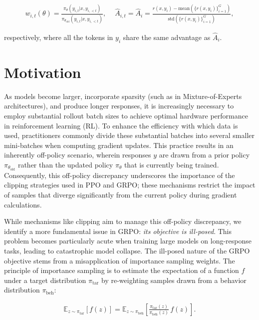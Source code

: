 \begin{align}
    w_{i,t}(\theta)=\frac{ \pi_{\theta} (y_{i,t} | x, y_{i,<t}) }{ \pi_{\theta_\text{old}} (y_{i,t} | x,y_{i,<t})},\quad\ 
    \widehat{A}_{i,t} = \widehat{A}_{i} = \frac{r(x, y_i) - \mathrm{mean} \left( \{ r(x, y_i) \}_{i=1}^G \right) }{ \mathrm{std} \left( \{ r(x, y_i) \}_{i=1}^G \right) },
\end{align}

respectively, where all the tokens in $y_i$ share the same advantage as $\widehat{A}_{i}$.

\section{Motivation}
\label{sec:motivation}

As models become larger, incorporate sparsity (such as in Mixture-of-Experts architectures), and produce longer responses, it is increasingly necessary to employ substantial rollout batch sizes to achieve optimal hardware performance in reinforcement learning (RL). To enhance the efficiency with which data is used, practitioners commonly divide these substantial batches into several smaller mini-batches when computing gradient updates. This practice results in an inherently off-policy scenario, wherein responses $y$ are drawn from a prior policy $\pi_{\theta_\text{old}}$ rather than the updated policy $\pi_\theta$ that is currently being trained. Consequently, this off-policy discrepancy underscores the importance of the clipping strategies used in PPO and GRPO; these mechanisms restrict the impact of samples that diverge significantly from the current policy during gradient calculations.

While mechanisms like clipping aim to manage this off-policy discrepancy, we identify a more fundamental issue in GRPO: \textit{its objective is ill-posed}. This problem becomes particularly acute when training large models on long-response tasks, leading to catastrophic model collapse. The ill-posed nature of the GRPO objective stems from a misapplication of importance sampling weights. The principle of importance sampling is to estimate the expectation of a function $f$ under a target distribution $\pi_\text{tar}$ by re-weighting samples drawn from a behavior distribution $\pi_\text{beh}$:

\begin{align}
\mathbb{E}_{z \sim \pi_\text{tar}} \left[ f(z) \right] = \mathbb{E}_{z \sim \pi_\text{beh}} \left[ \frac{ \pi_\text{tar} (z) }{ \pi_\text{beh} (z)} \, f(z) \right].
\end{align}

